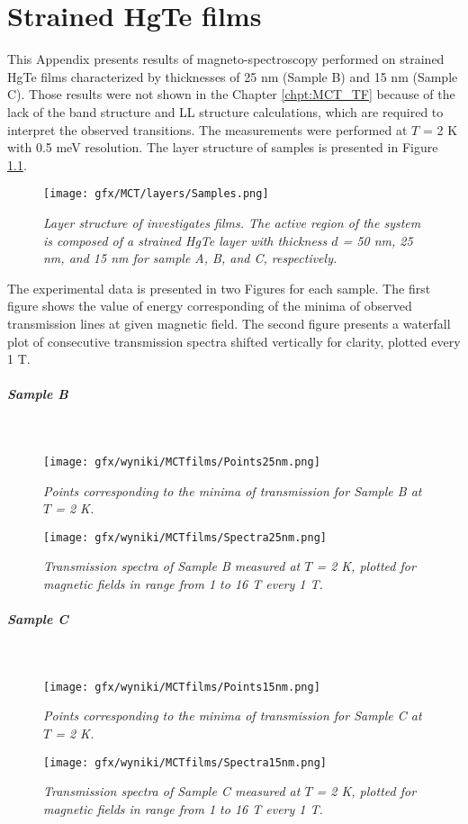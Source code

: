 \documentclass[titlepage,a4paper]{book}
\newcommand{\wciecie}{\quad\phantom{v}}
\newcommand{\myparagraph}[1]{\paragraph{#1}\mbox{}\\}
\begin{document}
\chapter{Strained HgTe films}
\label{Appendix_films}
\wciecie
This Appendix presents results of magneto-spectroscopy performed on strained HgTe films characterized by thicknesses of 25 nm (Sample B) and 15 nm (Sample C). Those results were not shown in the Chapter \ref{chpt:MCT_TF} because of the lack of the band structure and LL structure calculations, which are required to interpret the observed transitions. The measurements were performed at $T$ = 2 K with 0.5 meV resolution. The layer structure of samples is presented in Figure \ref{fig:Samples_layers2}.

\begin{figure}[ht]
	\centering
	\texttt{[image: gfx/MCT/layers/Samples.png]}
	\vspace{-10pt}
	\caption{\textit{Layer structure of investigates films. The active region of the system is composed of a strained HgTe layer with thickness $d$ = 50 nm, 25 nm, and 15 nm for sample A, B, and C, respectively.}}
	\label{fig:Samples_layers2}
\end{figure} 

The experimental data is presented in two Figures for each sample. The first figure shows the value of energy corresponding of the minima of observed transmission lines at given magnetic field. The second figure presents a waterfall plot of consecutive transmission spectra shifted vertically for clarity, plotted every 1 T.

\clearpage
\myparagraph{Sample B}
\begin{figure}[H]
	\centering
	\texttt{[image: gfx/wyniki/MCTfilms/Points25nm.png]}
	\vspace{-10pt}
	\caption{\textit{Points corresponding to the minima of transmission for Sample B at $T$ = 2 K.}}
	\label{fig:Points25nm}
\end{figure}
\begin{figure}[H]
	\centering
	\texttt{[image: gfx/wyniki/MCTfilms/Spectra25nm.png]}
	\vspace{-10pt}
	\caption{\textit{Transmission spectra of Sample B measured at $T$ = 2 K, plotted for magnetic fields in range from 1 to 16 T every 1 T.}}
	\label{fig:Spectra25nm}
\end{figure}

\clearpage
\myparagraph{Sample C}
\begin{figure}[H]
	\centering
	\texttt{[image: gfx/wyniki/MCTfilms/Points15nm.png]}
	\vspace{-10pt}
	\caption{\textit{Points corresponding to the minima of transmission for Sample C at $T$ = 2 K.}}
	\label{fig:Points15nm}
\end{figure}
\begin{figure}[H]
	\centering
	\texttt{[image: gfx/wyniki/MCTfilms/Spectra15nm.png]}
	\vspace{-10pt}
	\caption{\textit{Transmission spectra of Sample C measured at $T$ = 2 K, plotted for magnetic fields in range from 1 to 16 T every 1 T.}}
	\label{fig:Spectra15nm}
\end{figure}
\end{document}
